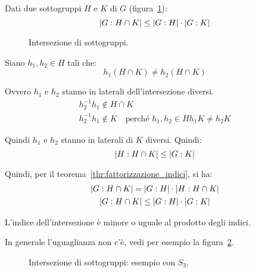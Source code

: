 \begin{esercizio}
	Dati due sottogruppi $H$ e $K$ di $G$ (figura~\ref{fig:Laterali_intersezione_di_sottogruppi}):
	\begin{equation*}
		\lvert G:H \cap K \rvert \le \lvert G:H \rvert \cdot \lvert G:K \rvert
	\end{equation*}
\end{esercizio}
\begin{figure}[tp]
	\centering
	\caption{Intersezione di sottogruppi.}
	\label{fig:Laterali_intersezione_di_sottogruppi}
\end{figure}
\begin{soluzione}
	Siano $h_1, h_2 \in H$ tali che:
	\begin{equation*}
		h_1(H \cap K) \ne h_2(H \cap K)
	\end{equation*}

	Ovvero $h_1$ e $h_2$ stanno in laterali dell'intersezione diversi.
	\begin{gather*}
		h_2^{-1}h_1 \not\in H \cap K \\
		h_2^{-1}h_1 \not\in K \quad \text{perché } h_1, h_2 \in H
		h_1 K \ne h_2 K
	\end{gather*}

	Quindi $h_1$ e $h_2$ stanno in laterali di $K$ diversi.
	Quindi:
	\begin{equation*}
		\lvert H:H \cap K \rvert \le \lvert G:K \rvert
	\end{equation*}

	Quindi, per il teorema~\ref{thr:fattorizzazione_indici}, si ha:
	\begin{gather*}
		\lvert G:H \cap K \rvert = \lvert G:H \rvert \cdot \lvert H:H \cap K \rvert \\
		\lvert G:H \cap K \rvert \le \lvert G:H \rvert \cdot \lvert G:K \rvert
	\end{gather*}

	L'indice dell'intersezione è minore o uguale al prodotto degli indici.
\end{soluzione}

In generale l'uguaglianza non c'è, vedi per esempio la figura~\ref{fig:Laterali_intersezione_di_sottogruppi_esempio_s3}.

\begin{figure}[tp]
	\centering
	\caption{Intersezione di sottogruppi: esempio con $S_3$.}
	\label{fig:Laterali_intersezione_di_sottogruppi_esempio_s3}
\end{figure}


